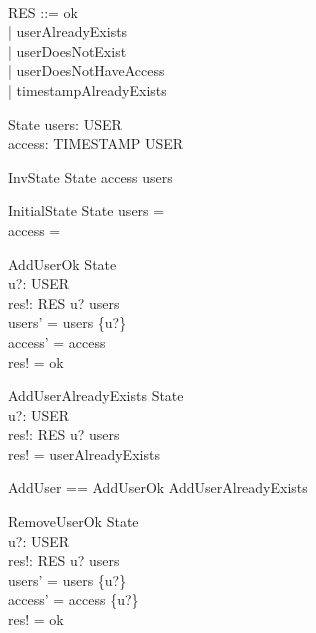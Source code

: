 \begin{zed}
     \\
    RES ::= ok \\
          | userAlreadyExists \\
          | userDoesNotExist \\
          | userDoesNotHaveAccess \\
          | timestampAlreadyExists \\
\end{zed}

\begin{schema}{State}
    users: \power USER \\
    access: TIMESTAMP \pfun USER
\end{schema}

\begin{schema}{InvState}
    State
    \where
    \ran access \subseteq users
\end{schema}

\begin{schema}{InitialState}
    State
    \where
    users = \emptyset \\
    access = \emptyset
\end{schema}

\begin{schema}{AddUserOk}
    \Delta State \\
    u?: USER \\
    res!: RES
    \where
    u? \notin users \\
    users' = users \cup \{u?\} \\
    access' = access \\
    res! = ok
\end{schema}

\begin{schema}{AddUserAlreadyExists}
    \Xi State \\
    u?: USER \\
    res!: RES
    \where
    u? \in users \\
    res! = userAlreadyExists
\end{schema}

\begin{zed}
    AddUser == AddUserOk \lor AddUserAlreadyExists
\end{zed}

\begin{schema}{RemoveUserOk}
    \Delta State \\
    u?: USER \\
    res!: RES
    \where
    u? \in users \\
    users' = users \setminus \{u?\} \\
    access' = access \nrres \{u?\} \\
    res! = ok
\end{schema}

